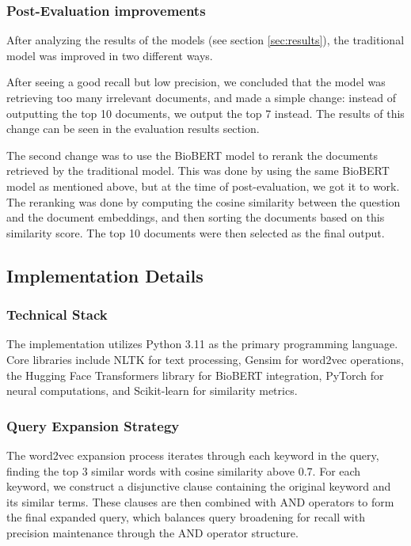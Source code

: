 \documentclass[12pt]{article}
\begin{document}
\subsubsection{Post-Evaluation improvements}
After analyzing the results of the models (see section \ref{sec:results}), the traditional model was improved in two different ways. 

After seeing a good recall but low precision, we concluded that the model was retrieving too many irrelevant documents, and made a simple change: instead of outputting the top 10 documents, we output the top 7 instead. The results of this change can be seen in the evaluation results section.

The second change was to use the BioBERT model to rerank the documents retrieved by the traditional model. This was done by using the same BioBERT model as mentioned above, but at the time of post-evaluation, we got it to work. The reranking was done by computing the cosine similarity between the question and the document embeddings, and then sorting the documents based on this similarity score. The top 10 documents were then selected as the final output.


\subsection{Implementation Details}

\subsubsection{Technical Stack}

The implementation utilizes Python 3.11 as the primary programming language. Core libraries include NLTK for text processing, Gensim for word2vec operations, the Hugging Face Transformers library for BioBERT integration, PyTorch for neural computations, and Scikit-learn for similarity metrics.

\subsubsection{Query Expansion Strategy}

The word2vec expansion process iterates through each keyword in the query, finding the top 3 similar words with cosine similarity above 0.7. For each keyword, we construct a disjunctive clause containing the original keyword and its similar terms. These clauses are then combined with AND operators to form the final expanded query, which balances query broadening for recall with precision maintenance through the AND operator structure.
\end{document}
